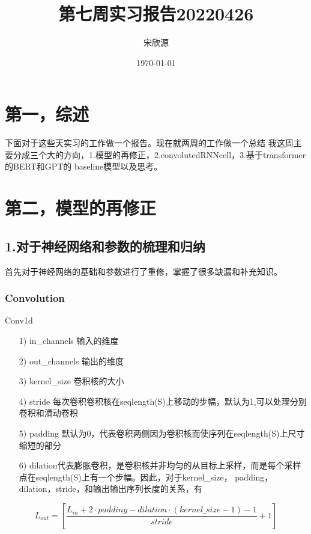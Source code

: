 \documentclass[11pt]{ctexart}
\begin{document}
\title{第七周实习报告20220426}
\author{宋欣源}
\date{\today}

\maketitle %


\section{第一，综述}

下面对于这些天实习的工作做一个报告。现在就两周的工作做一个总结
我这周主要分成三个大的方向，1.模型的再修正，2.convolutedRNNcell，3.基于transformer的BERT和GPT的 baseline模型以及思考。

\section{第二，模型的再修正}

\subsection{1.对于神经网络和参数的梳理和归纳}
首先对于神经网络的基础和参数进行了重修，掌握了很多缺漏和补充知识。

\subsubsection{Convolution}
Conv1d
\begin{itemize}
  \item [1)]
  in\_channels 输入的维度
  \item [2)]
  out\_channels 输出的维度
  \item [3)]
  kernel\_size 卷积核的大小
  \item [4)]
  stride 每次卷积卷积核在seqlength(S)上移动的步幅，默认为1,可以处理分别卷积和滑动卷积
  \item [5)]
  padding 默认为0，代表卷积两侧因为卷积核而使序列在seqlength(S)上尺寸缩短的部分
  \item [6)]
  dilation代表膨胀卷积，是卷积核并非均匀的从目标上采样，而是每个采样点在seqlength(S)上有一个步幅。因此，对于kernel\_size， padding，dilation，stride，和输出输出序列长度的关系，有
\end{itemize}

$$L_{out} = \left[ \frac{L_{in} + 2 \cdot padding - dilation \cdot (kernel\_size -1) -1}{stride} + 1 \right]$$
\end{document}
